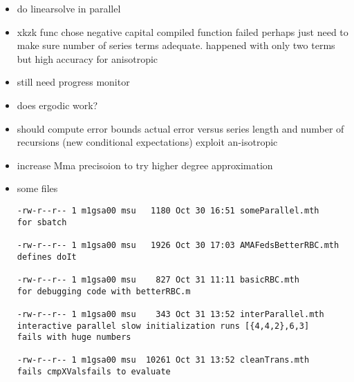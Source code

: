\documentclass[hyperref]{labbook}
\begin{document}
\begin{itemize}
\item do linearsolve in parallel
\item xkzk func chose negative capital compiled function failed perhaps just need to make sure number of series terms adequate. happened with only two terms but high accuracy for anisotropic
\item still need progress monitor
\item does ergodic work?
\item should compute error bounds actual error versus series length and number of recursions (new conditional expectations) exploit an-isotropic
\item increase Mma precisoion to try higher degree approximation 
\item some files
\begin{verbatim}
-rw-r--r-- 1 m1gsa00 msu   1180 Oct 30 16:51 someParallel.mth
for sbatch

-rw-r--r-- 1 m1gsa00 msu   1926 Oct 30 17:03 AMAFedsBetterRBC.mth
defines doIt

-rw-r--r-- 1 m1gsa00 msu    827 Oct 31 11:11 basicRBC.mth
for debugging code with betterRBC.m

-rw-r--r-- 1 m1gsa00 msu    343 Oct 31 13:52 interParallel.mth
interactive parallel slow initialization runs [{4,4,2},6,3]
fails with huge numbers 

-rw-r--r-- 1 m1gsa00 msu  10261 Oct 31 13:52 cleanTrans.mth
fails cmpXValsfails to evaluate


\end{verbatim}
\end{itemize}
\end{document}
